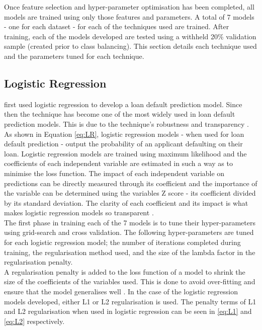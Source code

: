 Once feature selection and hyper-parameter optimisation has been completed, all models are trained using only those features and parameters. A total of 7 models - one for each dataset - for each of the techniques used are trained. After training, each of the models developed are tested using a withheld 20\% validation sample (created prior to class balancing). This section details each technique used and the parameters tuned for each technique.  

\subsection{Logistic Regression}

\textcite{LogRegWiginton} first used logistic regression to develop a loan default prediction model. Since then the technique has become one of the most widely used in loan default prediction models. This is due to the technique's robustness and transparency \parencite{LogisticReg}. \\ 

As shown in Equation \ref{eq:LR}, logistic regression models - when used for loan default prediction - output the probability of an applicant defaulting on their loan. Logistic regression models are trained using maximum likelihood and the coefficients of each independent variable are estimated in such a way as to minimise the loss function. The impact of each independent variable on predictions can be directly measured through its coefficient and the importance of the variable can be determined using the variables Z score - its coefficient divided by its standard deviation.  The clarity of each coefficient and its impact is what makes logistic regression models so transparent \parencite{Hastie}. \\

The first phase in training each of the 7 models is to tune their hyper-parameters using grid-search and cross validation. The following hyper-parameters are tuned for each logistic regression model; the number of iterations completed during training, the regularisation method used, and the size of the lambda factor in the regularisation penalty. \\

A regularisation penalty is added to the loss function of a model to shrink the size of the coefficients of the variables used. This is done to avoid over-fitting and ensure that the model generalises well \parencite{Regularisation}. In the case of the logistic regression models developed, either L1 or L2 regularisation is used. The penalty terms of L1 and L2 regularisation when used in logistic regression can be seen in \ref{eq:L1} and \ref{eq:L2} respectively. \\

